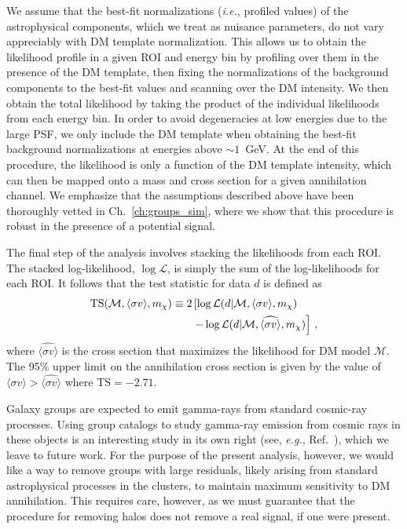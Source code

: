 We assume that the best-fit normalizations (\emph{i.e.}, profiled values) of the astrophysical components, which we treat as nuisance parameters, do not vary appreciably with DM template normalization. This allows us to obtain the likelihood profile in a given ROI and energy bin by profiling over them in the presence of the DM template, then fixing the normalizations of the background components to the best-fit values and scanning over the DM intensity. We then obtain the total likelihood by taking the product of the individual likelihoods from each energy bin. In order to avoid degeneracies at low energies due to the large PSF, we only include the DM template when obtaining the best-fit background normalizations at energies above $\sim$$1$~GeV. At the end of this procedure, the likelihood is only a function of the DM template intensity, which can then be mapped onto a mass and cross section for a given annihilation channel. We emphasize that the assumptions described above have been thoroughly vetted in Ch.~\ref{ch:groups_sim}, where we show that this procedure is robust in the presence of a potential signal.

The final step of the analysis involves stacking the likelihoods from each ROI. The stacked log-likelihood, $\log \mathcal{L}$, is simply the sum of the log-likelihoods for each ROI.  It follows that the test statistic for data $d$ is defined as
 \begin{equation}\begin{aligned}
{\rm TS}(\mathcal{M}, \langle\sigma v\rangle, m_\chi) \equiv 2 &\left[ \log \mathcal{L}(d | \mathcal{M}, \langle\sigma v\rangle, m_\chi ) \right.\\
&\left.- \log \mathcal{L}(d | \mathcal{M}, \widehat{\langle\sigma v\rangle}, m_\chi ) \right]\,,
\label{eq:TSdef}
\end{aligned}\end{equation}
where $\widehat{\langle\sigma v\rangle}$ is the cross section that maximizes the likelihood for DM model $\mathcal{M}$.    The 95\% upper limit on the annihilation cross section is given by the value of $\langle\sigma v\rangle > \widehat{\langle \sigma v\rangle}$ where $\text{TS}=-2.71$.

Galaxy groups are expected to emit gamma-rays from standard cosmic-ray processes.  Using group catalogs to study gamma-ray emission from cosmic rays in these objects is an interesting study in its own right (see, {\it e.g.}, Ref.~\cite{Jeltema:2008vu,Huber:2013cia,Ackermann:2015fdi,Rephaeli:2015nca}), which we leave to future work.  For the purpose of the present analysis, however, we would like a way to remove groups with large residuals, likely arising from standard astrophysical processes in the clusters, to maintain maximum sensitivity to DM annihilation.  This requires care, however, as we must guarantee  that the procedure for removing halos does not remove a real signal, if one were present.  

